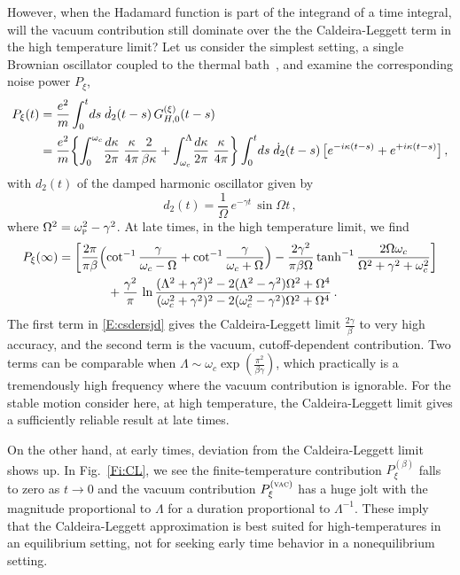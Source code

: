 \documentclass[11pt,a4paper]{article}
\begin{document}
However, when the Hadamard function is part of the integrand of a time integral, will the vacuum contribution still dominate over the the Caldeira-Leggett term in the high temperature limit? Let us consider the simplest setting, a {single} Brownian oscillator {coupled to the thermal bath}~\cite{HH15AOP,HC18}, and examine the corresponding noise power $P_{\xi}$,
\begin{align}\label{E:eiufgsjdw}
	P_{\xi}(t)&=\frac{e^{2}}{m}\int_{0}^{t}\!ds\;\dot{d}_{2}(t-s)\,G_{H,0}^{(\xi)}(t-s)\notag\\
				&=\frac{e^{2}}{m}\biggl\{\int_{0}^{\omega_{c}}\!\frac{d\kappa}{2\pi}\;\frac{\kappa}{4\pi}\frac{2}{\beta\kappa}+\int_{\omega_{c}}^{\Lambda}\!\frac{d\kappa}{2\pi}\;\frac{\kappa}{4\pi}\biggr\}\int_{0}^{t}\!ds\;\dot{d}_{2}(t-s)\,\bigl[e^{-i\kappa(t-s)}+e^{+i\kappa(t-s)}\bigr]\,,
\end{align}
with $d_{2}(t)$ of the damped harmonic oscillator given by
\begin{equation}
	d_{2}(t)=\frac{1}{\Omega}\,e^{-\gamma t}\,\sin\Omega t\,,
\end{equation}
where $\Omega^{2}=\omega_{\textsc{p}}^{2}-\gamma^{2}$. At late times, in the high temperature limit, we find
\begin{align}\label{E:csdersjd}
	P_{\xi}(\infty)&=\biggl[\frac{2\pi}{\pi\beta}\Bigl(\cot^{-1}\frac{\gamma}{\omega_{c}-\Omega}+\cot^{-1}\frac{\gamma}{\omega_{c}+\Omega}\Bigr)-\frac{2\gamma^{2}}{\pi\beta\Omega}\tanh^{-1}\frac{2\Omega\omega_{c}}{\Omega^{2}+\gamma^{2}+\omega_{c}^{2}}\biggr]\notag\\
	&\qquad\qquad+\frac{\gamma^{2}}{\pi}\,\ln\frac{(\Lambda^{2}+\gamma^{2})^{2}-2(\Lambda^{2}-\gamma^{2})\Omega^{2}+\Omega^{4}}{(\omega_{c}^{2}+\gamma^{2})^{2}-2(\omega_{c}^{2}-\gamma^{2})\Omega^{2}+\Omega^{4}}\,.
\end{align}
The first term in \eqref{E:csdersjd} gives the Caldeira-Leggett limit $\frac{2\gamma}{\beta}$ to very high accuracy, and the second term is the vacuum, cutoff-dependent contribution. Two terms can be comparable when $\Lambda\sim\omega_{c}\exp(\frac{\pi^{2}}{\beta\gamma})$, which practically is a tremendously high frequency where {the vacuum contribution is ignorable}.  For the stable motion consider here, at high temperature, the Caldeira-Leggett limit gives a sufficiently reliable result at late times.

On the other hand, at early times, deviation from the Caldeira-Leggett limit shows up. In Fig.~\ref{Fi:CL}, we see the finite-temperature contribution $P_{\xi}^{(\beta)}$ falls to zero as $t\to 0$ and the vacuum contribution $P_{\xi}^{(\textsc{vac})}$ has a huge jolt with the magnitude proportional to $\Lambda$ for a duration proportional to $\Lambda^{-1}$. These imply that the Caldeira-Leggett approximation is best suited for high-temperatures in an equilibrium setting, not for seeking early time behavior in a nonequilibrium setting.
\end{document}
